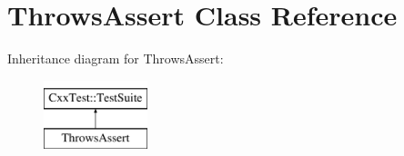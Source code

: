 \hypertarget{classThrowsAssert}{\section{Throws\-Assert Class Reference}
\label{classThrowsAssert}
}
Inheritance diagram for Throws\-Assert\-:\begin{figure}[H]
\begin{center}
\leavevmode
\includegraphics[height=2.000000cm]{classThrowsAssert}
\end{center}
\end{figure}
